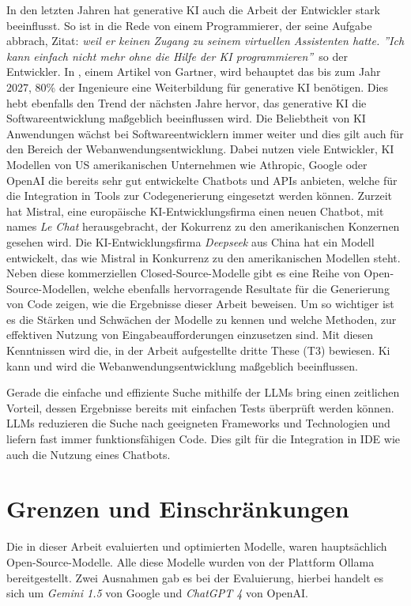 In den letzten Jahren hat generative KI auch die Arbeit der Entwickler stark beeinflusst. So ist in \cite{focus-online-2025} die Rede von einem Programmierer, der seine Aufgabe abbrach, Zitat: \glqq \textit{weil er keinen Zugang zu seinem virtuellen Assistenten hatte. ''Ich kann einfach nicht mehr ohne die Hilfe der KI programmieren''}\grqq \ so der Entwickler. In \cite{company_gartner_2024}, einem Artikel von Gartner, wird behauptet das bis zum Jahr 2027, 80\% der Ingenieure eine Weiterbildung für generative KI benötigen. Dies hebt ebenfalls den Trend der nächsten Jahre hervor, das generative KI die Softwareentwicklung maßgeblich beeinflussen wird.
Die Beliebtheit von KI Anwendungen wächst bei Softwareentwicklern immer weiter und dies gilt auch für den Bereich der Webanwendungsentwicklung. Dabei nutzen viele Entwickler, KI Modellen von US amerikanischen Unternehmen wie Athropic, Google oder OpenAI die bereits sehr gut entwickelte Chatbots und APIs anbieten, welche für die Integration in Tools zur Codegenerierung eingesetzt werden können. Zurzeit hat Mistral, eine europäische KI-Entwicklungsfirma einen neuen Chatbot, mit names \textit{Le Chat} herausgebracht, der Kokurrenz zu den amerikanischen Konzernen gesehen wird. Die KI-Entwicklungsfirma \textit{Deepseek} aus China hat ein Modell entwickelt, das wie Mistral in Konkurrenz zu den amerikanischen Modellen steht. Neben diese kommerziellen Closed-Source-Modelle gibt es eine Reihe von Open-Source-Modellen, welche ebenfalls hervorragende Resultate für die Generierung von Code zeigen, wie die Ergebnisse dieser Arbeit beweisen. Um so wichtiger ist es die Stärken und Schwächen der Modelle zu kennen und welche Methoden, zur effektiven Nutzung von Eingabeaufforderungen einzusetzen sind. Mit diesen Kenntnissen wird die, in der Arbeit aufgestellte dritte These (T3) bewiesen. Ki kann und wird die Webanwendungsentwicklung maßgeblich beeinflussen.\vspace{0.2cm}

Gerade die einfache und effiziente Suche mithilfe der LLMs bring einen zeitlichen Vorteil, dessen Ergebnisse bereits mit einfachen Tests überprüft werden können. LLMs reduzieren die Suche nach geeigneten Frameworks und Technologien und liefern fast immer funktionsfähigen Code. Dies gilt für die Integration in \acrshort{IDE} wie auch die Nutzung eines Chatbots.

\section{Grenzen und Einschränkungen}
Die in dieser Arbeit evaluierten und optimierten Modelle, waren hauptsächlich Open-Source-Modelle. Alle diese Modelle wurden von der Plattform Ollama bereitgestellt. Zwei Ausnahmen gab es bei der Evaluierung, hierbei handelt es sich um \textit{Gemini 1.5} von Google und \textit{ChatGPT 4} von OpenAI.\vspace{0.2cm}

